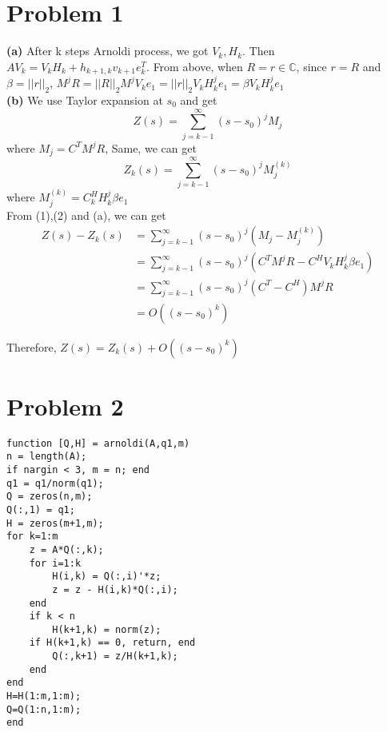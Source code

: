 \documentclass[11pt]{article}
\begin{document}


\section{Problem 1}
{\bf(a)} After k steps Arnoldi process, we got $V_k, H_k$. Then $AV_k=V_kH_k+h_{k+1,k}v_{k+1}e_k^T$. From above, when $R=r \in \mathbb{C}$, since $r=R$ and $\beta=||r||_2$, $M^jR=||R||_2M^jV_ke_1=||r||_2V_kH_k^je_1=\beta V_kH_k^je_1$\\
{\bf(b)} 
We use Taylor expansion at $s_0$ and get
\begin{equation}
	Z(s)=\sum\limits_{j=k-1}^\infty(s-s_0)^jM_j 
\end{equation}
where $M_j=C^TM^jR$, Same, we can get
\begin{equation}
Z_k(s)=\sum\limits_{j=k-1}^\infty(s-s_0)^jM_j^{(k)} 
\end{equation}
where $M_j^{(k)} =C_k^HH_k^j\beta e_1$\\
From (1),(2) and (a), we can get
\begin{equation*}
	\begin{split}
	Z(s)-Z_k(s)&=\sum\limits_{j=k-1}^\infty(s-s_0)^j(M_j-M_j^{(k)})\\
	&=\sum\limits_{j=k-1}^\infty(s-s_0)^j(C^TM^jR-C^HV_kH_k^j\beta e_1)\\
	&= \sum\limits_{j=k-1}^\infty(s-s_0)^j(C^T-C^H)M^jR\\
	&=O((s-s_0)^k)
	\end{split}
\end{equation*}

Therefore, $Z(s)=Z_k(s)+O((s-s_0)^k)$
 \\

\section{Problem 2}
\begin{lstlisting}
function [Q,H] = arnoldi(A,q1,m)
n = length(A);
if nargin < 3, m = n; end
q1 = q1/norm(q1);
Q = zeros(n,m); 
Q(:,1) = q1;
H = zeros(m+1,m);
for k=1:m
	z = A*Q(:,k);
	for i=1:k
		H(i,k) = Q(:,i)'*z;
		z = z - H(i,k)*Q(:,i);
	end
	if k < n
		H(k+1,k) = norm(z);
	if H(k+1,k) == 0, return, end
		Q(:,k+1) = z/H(k+1,k);
	end
end
H=H(1:m,1:m);
Q=Q(1:n,1:m);
end
\end{lstlisting}
\end{document}
